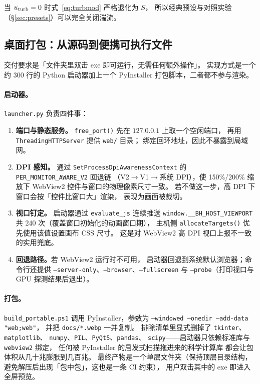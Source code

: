 \noindent
当 $u_{\rm turb}=0$ 时式~\eqref{eq:turbmod} 严格退化为 $S$，
所以经典预设与对照实验（\S\ref{sec:presets}）可以完全关闭湍流。

\subsection{桌面打包：从源码到便携可执行文件}\label{sec:pack}

交付要求是「文件夹里双击 exe 即可运行，无需任何额外操作」。
实现方式是一个约 300 行的 Python 启动器加上一个
PyInstaller 打包脚本，二者都不参与渲染。

\paragraph{启动器。}
\texttt{launcher.py} 负责四件事：
\begin{enumerate}[leftmargin=1.6em,itemsep=2pt,topsep=3pt]
\item \textbf{端口与静态服务。}
      \texttt{free\_port()} 先在 $127.0.0.1$ 上取一个空闲端口，
      再用 \texttt{ThreadingHTTPServer} 提供 \texttt{web/} 目录；
      绑定回环地址，因此不暴露到局域网。
\item \textbf{DPI 感知。}
      通过 \texttt{SetProcessDpiAwarenessContext} 的
      \texttt{PER\_MONITOR\_AWARE\_V2} 回退链
      （V2$\to$V1$\to$系统 DPI），使 150\%/200\% 缩放下
      WebView2 控件与窗口的物理像素尺寸一致。
      若不做这一步，高 DPI 下窗口会按「控件比窗口大」渲染，
      表现为画面被裁切。
\item \textbf{视口钉定。}
      启动器通过 \texttt{evaluate\_js} 连续推送
      \texttt{window.\_\_BH\_HOST\_VIEWPORT}
      共 240 次（覆盖窗口初始化的动画窗口期），
      主机侧 \texttt{allocateTargets()} 优先使用该值设置画布 CSS 尺寸。
      这是对 WebView2 高 DPI 视口上报不一致的实用兜底。
\item \textbf{回退路径。}若 WebView2 运行时不可用，
      启动器回退到系统默认浏览器；命令行还提供
      \texttt{--server-only}、\texttt{--browser}、\texttt{--fullscreen}
      与 \texttt{--probe}（打印视口与 GPU 探测结果后退出）。
\end{enumerate}

\paragraph{打包。}
\texttt{build\_portable.ps1} 调用 PyInstaller，参数为
\texttt{--windowed --onedir --add-data "web;web"}，
并把 \texttt{docs/*.webp} 一并复制。
排除清单里显式删掉了 \texttt{tkinter}、\texttt{matplotlib}、
\texttt{numpy}、\texttt{PIL}、\texttt{PyQt5}、\texttt{pandas}、
\texttt{scipy}——启动器只依赖标准库与 \texttt{webview2} 绑定，
任何被 PyInstaller 的启发式扫描拖进来的科学计算库
都会让包体积从几十兆膨胀到几百兆。
最终产物是一个单层文件夹（保持顶层目录结构，
避免解压后出现「包中包」，这也是一条 CI 约束），
用户双击其中的 exe 即进入全屏预览。

